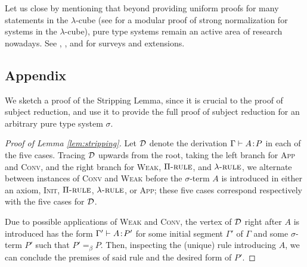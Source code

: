 \documentclass[reqno, twoside]{article}
\begin{document}
    Let us close by mentioning that beyond providing uniform proofs for many statements in the $\lambda$-cube (see \cite{GN91} for a modular proof of strong normalization for systems in the $\lambda$-cube), pure type systems remain an active area of research nowadays. See \cite{Ter95}, \cite{BHS01}, and \cite{BG05} for surveys and extensions.

    \subsection*{Appendix}

    We sketch a proof of the Stripping Lemma, since it is crucial to the proof of subject reduction, and use it to provide the full proof of subject reduction for an arbitrary pure type system $\sigma$.

    \begin{proof}[Proof of Lemma \ref{lem:stripping}]
        Let $\mathcal{D}$ denote the derivation $\Gamma\vdash A\!:\!P$ in each of the five cases. Tracing $\mathcal{D}$ upwards from the root, taking the left branch for \textsc{App} and \textsc{Conv}, and the right branch for \textsc{Weak}, $\Pi{\normalfont\textsc{-rule}}$, and $\lambda{\normalfont\textsc{-rule}}$, we alternate between instances of \textsc{Conv} and \textsc{Weak} before the $\sigma$-term $A$ is introduced in either an axiom, \textsc{Init}, $\Pi{\normalfont\textsc{-rule}}$, $\lambda{\normalfont\textsc{-rule}}$, or \textsc{App}; these five cases correspond respectively with the five cases for $\mathcal{D}$.

        Due to possible applications of \textsc{Weak} and \textsc{Conv}, the vertex of $\mathcal{D}$ right after $A$ is introduced has the form $\Gamma'\vdash A\!:\!P'$ for some initial segment $\Gamma'$ of $\Gamma$ and some $\sigma$-term $P'$ such that $P'=_\beta P$. Then, inspecting the (unique) rule introducing $A$, we can conclude the premises of said rule and the desired form of $P'$.
    \end{proof}
\end{document}

